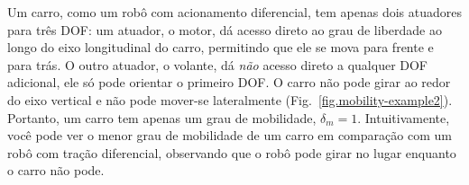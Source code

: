 {%

Um carro, como um robô com acionamento diferencial, tem apenas dois atuadores para três DOF: um atuador, o motor, dá acesso direto ao grau de liberdade ao longo do eixo longitudinal do carro, permitindo que ele se mova para frente e para trás. O outro atuador, o volante, dá \emph{não} acesso direto a qualquer DOF adicional, ele só pode orientar o primeiro DOF. O carro não pode girar ao redor do eixo vertical e não pode mover-se lateralmente (Fig.~\ref{fig.mobility-example2}). Portanto, um carro tem apenas um grau de mobilidade, $\delta_m = 1$. Intuitivamente, você pode ver o menor grau de mobilidade de um carro em comparação com um robô com tração diferencial, observando que o robô pode girar no lugar enquanto o carro não pode.

}

